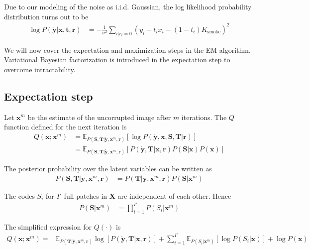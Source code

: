 Due to our modeling of the noise as i.i.d. Gaussian, the log likelihood probability distribution turns out to be
\begin{align}
\log P \left( \mathbf{\mathring y}| \mathbf{x}, \mathbf{t}, \mathbf{r} \right) &= - \frac{1}{\sigma^2} \sum_{i | r_i = 0} \left( y_i - t_i x_i - (1-t_i) K_\text{smoke} \right)^2
\end{align}

We will now cover the expectation and maximization steps in the EM algorithm. Variational Bayesian factorization is introduced in the expectation step to overcome intractability.


\subsection{Expectation step}
Let $\mathbf{x}^m$ be the estimate of the uncorrupted image after $m$ iterations. The $Q$ function defined for the next iteration is
\begin{align}
Q(\mathbf{x}; \mathbf{x}^m) &= \mathbb{E}_{ P \left( \mathbf{S}, \mathbf{T} | \mathbf{\mathring y}, \mathbf{x}^m, \mathbf{r} \right)} \left[ \log P \left( \mathbf{\mathring y}, \mathbf{x}, \mathbf{S}, \mathbf{T} | \mathbf{r} \right)\right] \nonumber \\
&= \mathbb{E}_{ P \left( \mathbf{S}, \mathbf{T} | \mathbf{\mathring y}, \mathbf{x}^m, \mathbf{r} \right)} \left[ P \left( \mathbf{\mathring y}, \mathbf{T}| \mathbf{x}, \mathbf{r} \right) P \left( \mathbf{S} | \mathbf{x} \right) P \left( \mathbf{x} \right) \right] \label{eqn:Qvbem2}
\end{align}

The posterior probability over the latent variables can be written as
\begin{align}
P \left( \mathbf{S}, \mathbf{T} | \mathbf{y}, \mathbf{x}^m, \mathbf{r} \right) &= P \left( \mathbf{T} | \mathbf{y}, \mathbf{x}^m, \mathbf{r} \right) P \left( \mathbf{S} | \mathbf{x}^m \right) \label{eqn:latentPosterior}
\end{align}

The codes $S_i$ for $I'$ full patches in $\mathbf{X}$ are independent of each other. Hence
\begin{align}
P \left( \mathbf{S} | \mathbf{x}^m\right) &= \prod_{i=1}^{I'} P \left( S_i | \mathbf{x}^m \right) \label{eqn:obCodeFact} 
\end{align}

The simplified expression for $Q\left( \cdot \right)$ is
\begin{align}
Q(\mathbf{x}; \mathbf{x}^m) = &\mathbb{E}_{ P \left( \mathbf{T} | \mathbf{\mathring y}, \mathbf{x}^m, \mathbf{r} \right)} \log \left[ P \left( \mathbf{\mathring y}, \mathbf{T} | \mathbf{x}, \mathbf{r} \right) \right] 
+ \sum_{i=1}^{I'} \mathbb{E}_{ P \left( S_i | \mathbf{x}^m \right)} \left[ \log P \left( S_i | \mathbf{x} \right) \right]
+ \log P \left( \mathbf{x} \right) \label{eqn:QSimplified} 
\end{align}

